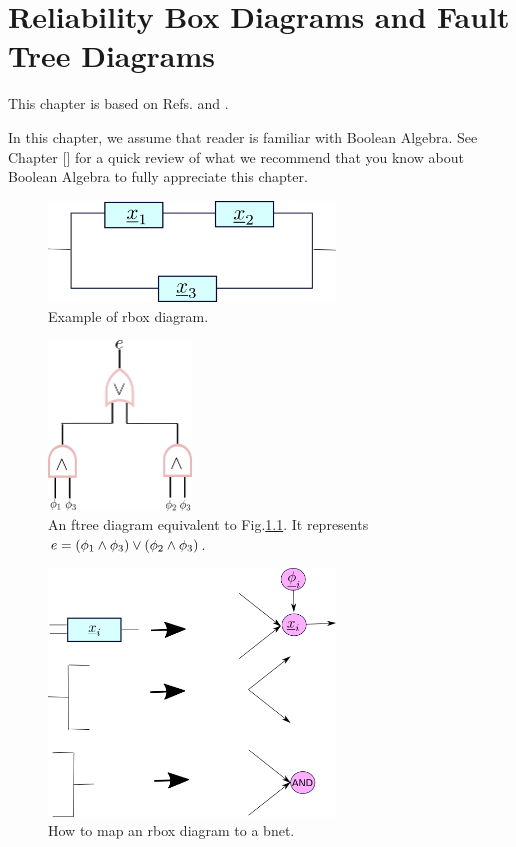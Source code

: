 \chapter{Reliability Box Diagrams and Fault 
Tree Diagrams}
This chapter is based on
Refs.\cite{reliasoft}
and \cite{ftree-manual}.

In this chapter, we assume that
reader is familiar
with
Boolean Algebra. See 
 Chapter []
for a quick review 
of what
we recommend that you know about
Boolean Algebra
to fully appreciate this chapter.

\begin{figure}[h!]
\centering
\includegraphics[width=3in]
{reliability/relia-example.png}
\caption{Example of rbox diagram.} 
\label{fig-relia-rbox}
\end{figure}

\begin{figure}[h!]
\centering
\includegraphics[width=1.5in]
{reliability/relia-ftree.png}
\caption{An ftree diagram equivalent to
Fig.\ref{fig-relia-rbox}. It
represents 
$e=(\phi_1\wedge \phi_3)\vee(\phi_2\wedge\phi_3)$. } 
\label{fig-relia-ftree}
\end{figure}

\begin{figure}[h!]
\centering
\includegraphics[width=3in]
{reliability/relia-map.png}
\caption{How to map an rbox diagram to a bnet.} 
\label{fig-relia-map}
\end{figure}

